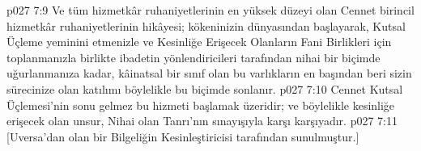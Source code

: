 \vs p027 7:9 Ve tüm hizmetkâr ruhaniyetlerinin en yüksek düzeyi olan Cennet birincil hizmetkâr ruhaniyetlerinin hikâyesi; kökeninizin dünyasından başlayarak, Kutsal Üçleme yeminini etmenizle ve Kesinliğe Erişecek Olanların Fani Birlikleri için toplanmanızla birlikte ibadetin yönlendiricileri tarafından nihai bir biçimde uğurlanmanıza kadar, kâinatsal bir sınıf olan bu varlıkların en başından beri sizin sürecinize olan katılımı böylelikle bu biçimde sonlanır.
\vs p027 7:10 Cennet Kutsal Üçlemesi’nin sonu gelmez bu hizmeti başlamak üzeridir; ve böylelikle kesinliğe erişecek olan unsur, Nihai olan Tanrı’nın sınayışıyla karşı karşıyadır.
\vs p027 7:11 [Uversa’dan olan bir Bilgeliğin Kesinleştiricisi tarafından sunulmuştur.]
